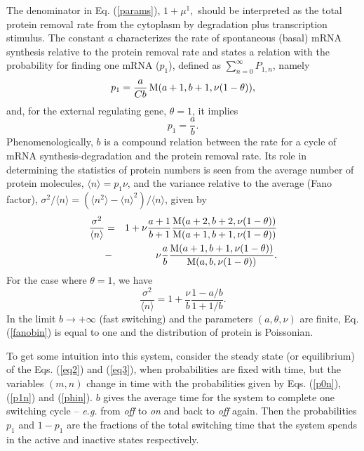 The denominator in Eq. (\ref{params}), $1+\mu^1,$ should be
interpreted as the total protein removal rate from the cytoplasm by
degradation plus transcription stimulus.  The constant $a$
characterizes the rate of spontaneous (basal) mRNA synthesis relative
to the protein removal rate and states a relation with the probability
for finding one mRNA ($p_1$), defined as $\sum_{n=0}^\infty P_{1,n}$,
namely
\begin{equation}
p_1 = \frac{a}{C b}\,
{\rm M}(a+1,b+1,\nu(1-\theta)),
\end{equation}
and, for the external regulating gene, $\theta=1$, it
implies $$p_1=\frac{a}{b}.$$ Phenomenologically, $b$ is a compound
relation between the rate for a cycle of mRNA synthesis-degradation
and the protein removal rate.  Its role in determining the statistics
of protein numbers is seen from the average number of protein
molecules, $\langle n \rangle = p_1 \nu $, and the variance relative
to the average (Fano factor), $\sigma^2/\langle n \rangle = (\langle
n^2 \rangle - \langle n \rangle ^ 2)/ \langle n \rangle$, given by
\begin{eqnarray}
\frac{\sigma^2}{\langle n \rangle} &=&
1 + \nu\frac{a+1}{b+1}
\frac{{\rm M}(a+2, b+2, \nu(1-\theta))}{{\rm M}(a+1, b+1, \nu(1-\theta))}
\nonumber \\
&-& \nu\frac{a}{b}
\frac{{\rm M}(a+1, b+1, \nu(1-\theta))}{{\rm M}(a, b, \nu(1-\theta))}. \label{fanobin}
\end{eqnarray}
For the case where $\theta=1$, we have
\begin{equation}\label{fanoext}
\frac{\sigma^2}{\langle n \rangle} = 1 + \frac{\nu}{b}\frac{1-a/b}{1+1/b}.
\end{equation}
In the limit $b\rightarrow +\infty$ (fast switching) and the
parameters $(a, \theta, \nu)$ are finite, Eq. (\ref{fanobin}) is equal
to one and the distribution of protein is Poissonian.

To get some intuition into this system, consider the steady state (or
equilibrium) of the Eqs. (\ref{eq2}) and (\ref{eq3}), when
probabilities are fixed with time, but the variables $(m,n)$ change in
time with the probabilities given by Eqs. (\ref{p0n}), (\ref{p1n}) and
(\ref{phin}).  $b$ gives the average time for the system to complete
one switching cycle -- {\em e.g.} from {\em off} to {\em on} and back
to {\em off} again.  Then the probabilities $p_1$ and $1-p_1$ are the
fractions of the total switching time that the system spends in the
active and inactive states respectively.


